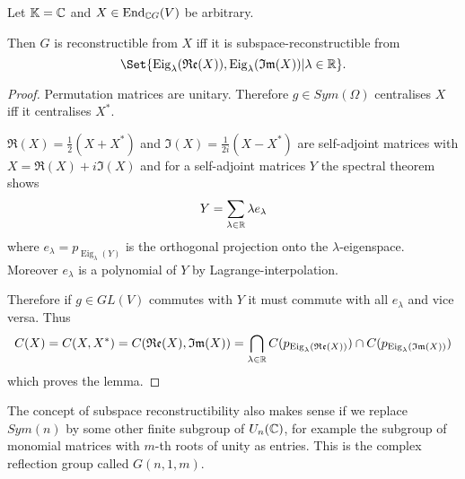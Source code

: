 \documentclass[fontsize=11pt,fleqn,a4paper]{scrartcl}
\begin{document}
\begin{lemma}
Let $\mathbb{K}=\mathbb{C}$ and $X\in\operatorname{End}_{\mathbb{C} G}(V)$ be arbitrary.

Then $G$ is reconstructible from $X$ iff it is subspace-reconstructible from
\[\Set{\operatorname{Eig}_\lambda(\Re(X)),\operatorname{Eig}_\lambda(\Im(X)) | \lambda\in\IR}.\]
\end{lemma}
\begin{proof}
Permutation matrices are unitary. Therefore $g\in Sym(\Omega)$ centralises $X$ iff it centralises $X^\ast$.

$\Re(X) = \frac{1}{2}(X+X^\ast)$ and $\Im(X)=\frac{1}{2i}(X-X^\ast)$ are self-adjoint matrices with $X=\Re(X)+i\Im(X)$ and for a self-adjoint matrices $Y$ the spectral theorem shows
\[Y = \sum_{\lambda\in\mathbb{R}} \lambda e_\lambda\]
where $e_\lambda=p_{\operatorname{Eig}_\lambda(Y)}$ is the orthogonal projection onto the $\lambda$-eigenspace. Moreover $e_\lambda$ is a polynomial of $Y$ by Lagrange-interpolation.

Therefore if $g\in GL(V)$ commutes with $Y$ it must commute with all $e_\lambda$ and vice versa. Thus
\[C(X) = C(X,X^\ast) = C(\operatorname{\mathfrak{Re}}(X),\operatorname{\mathfrak{Im}}(X))=\bigcap_{\lambda\in\mathbb{R}} C(p_{\operatorname{Eig}_\lambda(\operatorname{\mathfrak{Re}}(X))}) \cap C(p_{\operatorname{Eig}_\lambda(\operatorname{\mathfrak{Im}}(X))})\]
which proves the lemma.
\end{proof}

\begin{remark}
The concept of subspace reconstructibility also makes sense if we replace $Sym(n)$ by some other finite subgroup of $U_n(\mathbb{C})$, for example the subgroup of monomial matrices with $m$-th roots of unity as entries. This is the complex reflection group called $G(n,1,m)$.
\end{remark}
\end{document}
